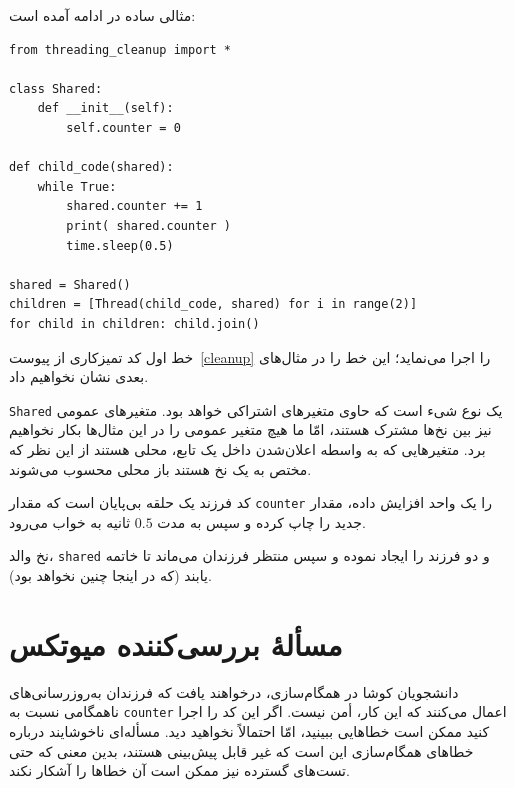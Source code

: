 \documentclass{book}
\begin{document}
    مثالی ساده در ادامه آمده است: 

\begin{latin}
\begin{lstlisting}
from threading_cleanup import *

class Shared:
    def __init__(self):
        self.counter = 0

def child_code(shared):
    while True:
        shared.counter += 1
        print( shared.counter )
        time.sleep(0.5)

shared = Shared()
children = [Thread(child_code, shared) for i in range(2)]
for child in children: child.join()
\end{lstlisting}
\end{latin}

    خط اول کد تمیزکاری از پیوست~\ref{cleanup} را اجرا می‌نماید؛ این خط را در مثال‌های بعدی نشان نخواهیم داد. 

    {\tt Shared}  
    یک نوع شیء است که حاوی متغیرهای اشتراکی خواهد بود. متغیرهای عمومی نیز بین نخ‌ها مشترک هستند، 
    امّا ما هیچ متغیر عمومی‌ را در این مثال‌ها بکار نخواهیم برد. 
    متغیرهایی که به واسطه اعلان‌شدن داخل یک تابع، محلی هستند از این نظر که مختص به یک نخ هستند باز محلی محسوب می‌شوند.

    کد فرزند یک حلقه بی‌پایان است که مقدار {\tt counter} را یک واحد افزایش داده، مقدار جدید را چاپ کرده و سپس به مدت $0.5$ ثانیه به خواب می‌رود. 

    نخ والد،  {\tt shared} و دو فرزند را ایجاد نموده و سپس منتظر فرزندان می‌ماند تا خاتمه یابند (که در اینجا چنین نخواهد بود).

\section{مسألهٔ بررسی‌کننده میوتکس}

    دانشجویان کوشا در همگام‌سازی، درخواهند یافت که فرزندان به‌روزرسانی‌های ناهمگامی نسبت به {\tt counter} اعمال می‌کنند که این کار، أمن نیست. 
    اگر این کد را اجرا کنید ممکن است خطاهایی ببینید، امّا احتمالاً نخواهید دید. مسأله‌ای ناخوشایند درباره خطاهای همگام‌سازی این است که غیر قابل پیش‌بینی هستند، 
    بدین معنی که حتی تست‌های  گسترده نیز  ممکن است آن خطاها  را آشکار نکند.
    
\end{document}
